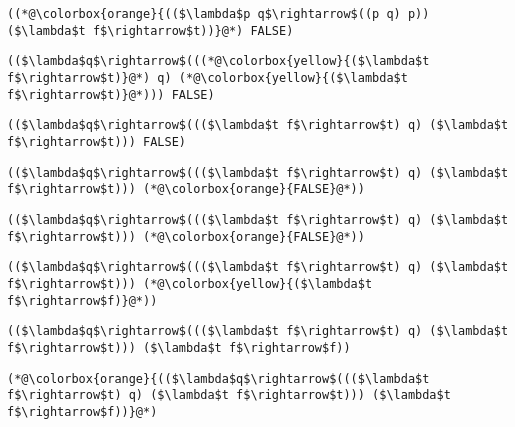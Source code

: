 \documentclass{beamer}
\begin{document}
\begin{frame}[fragile]{\CurrentSection}
\lstset{basicstyle=\ttfamily\small}\lstset{numbers=none}\lstset{language=ML}\begin{lstlisting}
((*@\colorbox{orange}{(($\lambda$p q$\rightarrow$((p q) p)) ($\lambda$t f$\rightarrow$t))}@*) FALSE)
\end{lstlisting}
\pause\lstset{language=ML}\begin{lstlisting}
(($\lambda$q$\rightarrow$(((*@\colorbox{yellow}{($\lambda$t f$\rightarrow$t)}@*) q) (*@\colorbox{yellow}{($\lambda$t f$\rightarrow$t)}@*))) FALSE)
\end{lstlisting}

\end{frame}

\begin{frame}[fragile]{\CurrentSection}
\lstset{basicstyle=\ttfamily\small}\lstset{numbers=none}\lstset{language=ML}\begin{lstlisting}
(($\lambda$q$\rightarrow$((($\lambda$t f$\rightarrow$t) q) ($\lambda$t f$\rightarrow$t))) FALSE)
\end{lstlisting}
\pause\lstset{language=ML}\begin{lstlisting}
(($\lambda$q$\rightarrow$((($\lambda$t f$\rightarrow$t) q) ($\lambda$t f$\rightarrow$t))) (*@\colorbox{orange}{FALSE}@*))
\end{lstlisting}

\end{frame}

\begin{frame}[fragile]{\CurrentSection}
\lstset{basicstyle=\ttfamily\small}\lstset{numbers=none}\lstset{language=ML}\begin{lstlisting}
(($\lambda$q$\rightarrow$((($\lambda$t f$\rightarrow$t) q) ($\lambda$t f$\rightarrow$t))) (*@\colorbox{orange}{FALSE}@*))
\end{lstlisting}
\pause\lstset{language=ML}\begin{lstlisting}
(($\lambda$q$\rightarrow$((($\lambda$t f$\rightarrow$t) q) ($\lambda$t f$\rightarrow$t))) (*@\colorbox{yellow}{($\lambda$t f$\rightarrow$f)}@*))
\end{lstlisting}

\end{frame}

\begin{frame}[fragile]{\CurrentSection}
\lstset{basicstyle=\ttfamily\small}\lstset{numbers=none}\lstset{language=ML}\begin{lstlisting}
(($\lambda$q$\rightarrow$((($\lambda$t f$\rightarrow$t) q) ($\lambda$t f$\rightarrow$t))) ($\lambda$t f$\rightarrow$f))
\end{lstlisting}
\pause\lstset{language=ML}\begin{lstlisting}
(*@\colorbox{orange}{(($\lambda$q$\rightarrow$((($\lambda$t f$\rightarrow$t) q) ($\lambda$t f$\rightarrow$t))) ($\lambda$t f$\rightarrow$f))}@*)
\end{lstlisting}

\end{frame}
\end{document}

